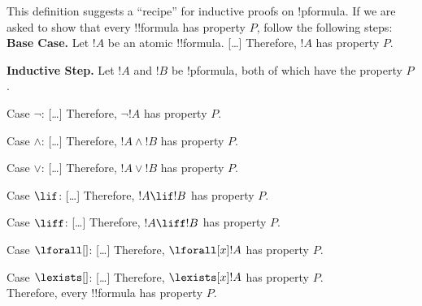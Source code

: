 \documentclass[../../include/open-logic-section]{subfiles}
\begin{document}
\begin{explain}
This definition suggests a ``recipe'' for inductive proofs on
!p{formula}. If we are asked to show that every !!{formula} has
property $P$, follow the following steps:\\

\textbf{Base Case.} Let $!A$ be an atomic !!{formula}. [\ldots]
Therefore, $!A$ has property $P$.

\textbf{Inductive Step.} Let $!A$ and $!B$ be !p{formula}, both of
which have the property $P$.

Case $\lnot$: [\ldots] Therefore, $\lnot !A$ has property $P$.

Case $\land$: [\ldots] Therefore, $!A \land !B$ has property $P$. 

Case $\lor$: [\ldots] Therefore, $!A \lor !B$ has property $P$. 

Case $\lif$: [\ldots] Therefore, $!A \lif !B$ has property $P$.

Case $\liff$: [\ldots] Therefore, $!A \liff !B$ has property $P$.

Case $\lforall[]$: [\ldots] Therefore, $\lforall[x] !A$ has property $P$.

Case $\lexists[]$: [\ldots] Therefore, $\lexists[x] !A$ has property $P$. \\

Therefore, every !!{formula} has property $P$.
\end{explain}
\end{document}
